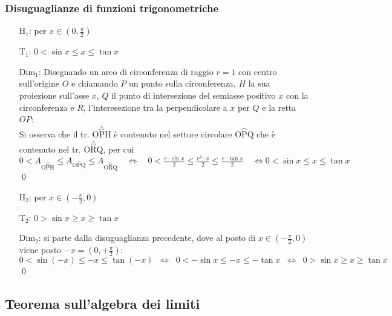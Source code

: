 \documentclass[a4paper]{article}
\begin{document}
\subsubsection*{Disuguaglianze di funzioni trigonometriche}
\begin{itemize}
	\item[H\(_1\):] per \(x \in \left( 0, \displaystyle \frac{\pi}{2} \right)\)
	\item[T\(_1\):] \(0 < \sin x \leq x \leq \tan x\)
	\item[Dim\(_1\):] Disegnando un arco di circonferenza di raggio \(r = 1\) con centro sull'origine \(O\) e chiamando \(P\) un punto sulla circonferenza, \(H\) la sua proiezione sull'asse \(x\),
	\(Q\) il punto di intersezione del semiasse positivo \(x\) con la circonferenza e \(R\), l'interesezione tra la perpendicolare a \(x\) per \(Q\) e la retta \(OP\): \\
	Si osserva che il tr. \(\overset{\triangle}{\text{OPH}}\) è contenuto nel settore circolare \(\overset{\smallfrown}{\text{OPQ}}\) che è contenuto nel tr. \(\overset{\triangle}{\text{ORQ}}\), per cui
	\(0 < A_{\overset{\triangle}{\text{OPH}}} \leq A_{\overset{\smallfrown}{\text{OPQ}}} \leq A_{\overset{\triangle}{\text{ORQ}}} \quad \Leftrightarrow
	\quad 0 < \frac{r \cdot \sin x}{2} \leq \frac{r ^ 2 \cdot x }{2} \leq \frac{r \cdot \tan x}{2} \quad \Leftrightarrow 0 < \sin x \leq x \leq \tan x \) \qed
	
	\item[H\(_2\):] per \(x \in \left( \displaystyle - \frac{\pi}{2}, 0 \right)\)
	\item[T\(_2\):] \(0 > \sin x \geq x \geq \tan x\)
	\item[Dim\(_2\):] si parte dalla disuguaglianza precedente, dove al posto di \(x \in \left( \displaystyle - \frac{\pi}{2}, 0 \right)\) viene posto \(-x = \left( 0, \displaystyle + \frac{\pi}{2} \right)\): \\
	\(0 < \sin \left( -x \right) \leq -x \leq \tan \left( -x \right) \;\; \Leftrightarrow \;\; 0 < -\sin x \leq -x \leq -\tan x \;\; \Leftrightarrow \;\; 0 > \sin x \geq x \geq \tan x\) \qed
\end{itemize}

\newpage


\subsection{Teorema sull'algebra dei limiti}
\end{document}
